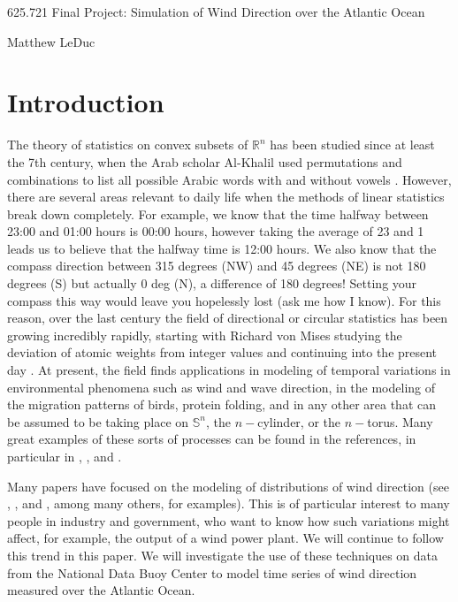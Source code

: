 \documentclass[12pt]{article}
\numberwithin{equation}{section}
\numberwithin{figure}{section}
\begin{document}
\onehalfspacing
\setlength\parindent{24pt}

\begin{center}


625.721 Final Project: Simulation of Wind Direction over the Atlantic Ocean

\null

Matthew LeDuc


\end{center}
\section{Introduction}

The theory of statistics on convex subsets of $\mathbb{R}^n$ has been studied since at least the 7th century, when the Arab scholar Al-Khalil used permutations and combinations to list all possible Arabic words with and without vowels \cite{Broemling}. However, there are several areas relevant to daily life when the methods of linear statistics break down completely. For example, we know that the time halfway between 23:00 and 01:00 hours is 00:00 hours, however taking the average of 23 and 1 leads us to believe that the halfway time is 12:00 hours. We also know that the compass direction between 315 degrees (NW) and 45 degrees (NE) is not 180 degrees (S) but actually 0 deg (N), a difference of 180 degrees! Setting your compass this way would leave you hopelessly lost (ask me how I know). For this reason, over the last century the field of directional or circular statistics has been growing incredibly rapidly, starting with Richard von Mises studying the deviation of atomic weights from integer values and continuing into the present day \cite{Mardia2}.  At present, the field finds applications in modeling of temporal variations in environmental phenomena such as wind and wave direction, in the modeling of the migration patterns of birds, protein folding, and in any other area that can be assumed to be taking place on $\mathbb{S}^n$, the $n-$cylinder, or the $n-$torus. Many great examples of these sorts of processes can be found in the references, in particular in \cite{Craig}, \cite{Kanti}, and \cite{Mardia2}. 

Many papers have focused on the modeling of distributions of wind direction (see \cite{Al Yammahi}, \cite{Craig}, and \cite{Mahrt}, among many others, for examples). This is of particular interest to many people in industry and government, who want to know how such variations might affect, for example, the output of a wind power plant. We will continue to follow this trend in this paper. We will investigate the use of these techniques on data from the National Data Buoy Center to model time series of wind direction measured over the Atlantic Ocean.
\end{document}
